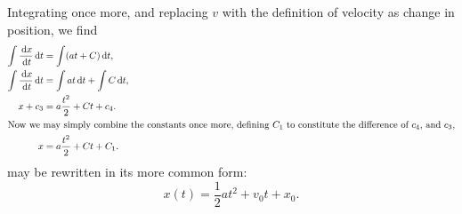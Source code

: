 \begin{ex}
    Integrating once more, and replacing $v$ with the definition of velocity as change in position, we find
    \begin{align}
        \int \frac{\,\mathrm{d} x}{\,\mathrm{d} t} \,\mathrm{d} t &= \int (at + C) \,\mathrm{d} t, \nonumber \\
        \int \frac{\,\mathrm{d} x}{\,\mathrm{d} t} \,\mathrm{d} t &= \int at \,\mathrm{d} t + \int C \,\mathrm{d} t, \nonumber \\
        x + c_3  &= a \frac{t^2}{2} + Ct + c_4. \nonumber \\
        \intertext{Now we may simply combine the constants once more, defining $C_1$ to constitute the difference of $c_4$, and $c_3$,}
        x &= a \frac{t^2}{2} + Ct + C_1. \label{eq:phys_const}
    \end{align}
     may be rewritten in its more common form:
    \begin{equation}
        x(t) = \frac{1}{2} a t^2 + v_0 t + x_0.
        \label{eq:position}
    \end{equation}
\end{ex}

